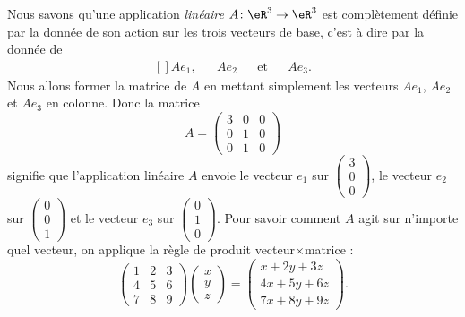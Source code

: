 Nous savons qu'une application \emph{linéaire} $A\colon \eR^3\to \eR^3$ est complètement définie par la donnée de son action sur les trois vecteurs de base, c'est à dire par la donnée de
\begin{equation}
	\begin{aligned}[]
		Ae_1,&&Ae_2&&\text{et}&&Ae_3.
	\end{aligned}
\end{equation}
Nous allons former la matrice de $A$ en mettant simplement les vecteurs $Ae_1$, $Ae_2$ et $Ae_3$ en colonne. Donc la matrice
\begin{equation}		\label{EqExempleALin}
	A=\begin{pmatrix}
		3	&	0	&	0	\\
		0	&	1	&	0	\\
		0	&	1	&	0
	\end{pmatrix}
\end{equation}
signifie que l'application linéaire $A$ envoie le vecteur $e_1$ sur $\begin{pmatrix}
	3	\\ 
	0	\\ 
	0	
\end{pmatrix}$, le vecteur $e_2$ sur $\begin{pmatrix}
	0	\\ 
	0	\\ 
	1	
\end{pmatrix}$ et le vecteur $e_3$ sur $\begin{pmatrix}
	0	\\ 
	1	\\ 
	0	
\end{pmatrix}$.
Pour savoir comment $A$ agit sur n'importe quel vecteur, on applique la règle de produit vecteur$\times$matrice :
\begin{equation}
	\begin{pmatrix}
		1	&	2	&	3	\\
		4	&	5	&	6	\\
		7	&	8	&	9
	\end{pmatrix}\begin{pmatrix}
		x	\\ 
		y	\\ 
		z	
	\end{pmatrix}=
	\begin{pmatrix}
		x+2y+3z	\\ 
		4x+5y+6z	\\ 
		7x+8y+9z	
	\end{pmatrix}.
\end{equation}

